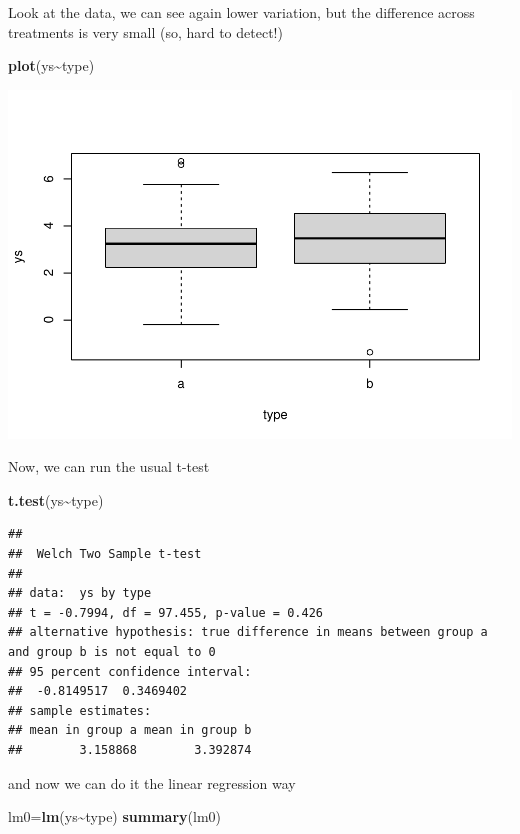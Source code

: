 \documentclass[
]{book}
\newenvironment{Shaded}{\begin{snugshade}}{\end{snugshade}}
\newcommand{\FunctionTok}[1]{\textcolor[rgb]{0.13,0.29,0.53}{\textbf{#1}}}
\newcommand{\NormalTok}[1]{#1}
\newcommand{\OtherTok}[1]{\textcolor[rgb]{0.56,0.35,0.01}{#1}}
\newcommand{\SpecialCharTok}[1]{\textcolor[rgb]{0.81,0.36,0.00}{\textbf{#1}}}
\begin{document}
Look at the data, we can see again lower variation, but the difference across treatments is very small (so, hard to detect!)

\begin{Shaded}
\begin{Highlighting}[]
\FunctionTok{plot}\NormalTok{(ys}\SpecialCharTok{\textasciitilde{}}\NormalTok{type)}
\end{Highlighting}
\end{Shaded}

\includegraphics{ECOMODbook_files/figure-latex/a8.16-1.pdf}

Now, we can run the usual t-test

\begin{Shaded}
\begin{Highlighting}[]
\FunctionTok{t.test}\NormalTok{(ys}\SpecialCharTok{\textasciitilde{}}\NormalTok{type)}
\end{Highlighting}
\end{Shaded}

\begin{verbatim}
## 
##  Welch Two Sample t-test
## 
## data:  ys by type
## t = -0.7994, df = 97.455, p-value = 0.426
## alternative hypothesis: true difference in means between group a and group b is not equal to 0
## 95 percent confidence interval:
##  -0.8149517  0.3469402
## sample estimates:
## mean in group a mean in group b 
##        3.158868        3.392874
\end{verbatim}

and now we can do it the linear regression way

\begin{Shaded}
\begin{Highlighting}[]
\NormalTok{lm0}\OtherTok{=}\FunctionTok{lm}\NormalTok{(ys}\SpecialCharTok{\textasciitilde{}}\NormalTok{type)}
\FunctionTok{summary}\NormalTok{(lm0)}
\end{Highlighting}
\end{Shaded}
\end{document}
